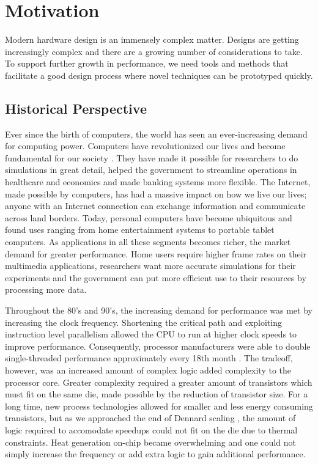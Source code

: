 \section{Motivation}

Modern hardware design is an immensely complex matter. Designs are getting
increasingly complex and there are a growing number of considerations to take.
To support further growth in performance, we need tools and methods that
facilitate a good design process where novel techniques can be prototyped
quickly.

\subsection{Historical Perspective}

Ever since the birth of computers, the world has seen an ever-increasing demand
for computing power. Computers have revolutionized our lives and become
fundamental for our society \cite{tanenbaum1984structured}. They have made it possible for
researchers to do simulations in great detail, helped the government to
streamline operations in healthcare and economics and made banking systems more
flexible. The Internet, made possible by computers, has had a massive impact on
how we live our lives; anyone with an Internet connection can exchange
information and communicate across land borders. Today, personal computers have
become ubiquitous and found uses ranging from home entertainment systems to
portable tablet computers. As applications in all these segments becomes richer,
the market demand for greater performance. Home users require higher frame
rates on their multimedia applications, researchers want more accurate
simulations for their experiments and the government can put more efficient use to
their resources by processing more data.

Throughout the 80's and 90's, the increasing demand for performance was met by
increasing the clock frequency. Shortening the critical path and exploiting
instruction level parallelism allowed the CPU to run at higher clock speeds to
improve performance. Consequently, processor manufacturers were able to double
single-threaded performance approximately every 18th month
\cite{moore1965cramming}. The tradeoff, however, was an increased amount of
complex logic added complexity to the processor core. Greater complexity
required a greater amount of transistors which must fit on the same die, made
possible by the reduction of transistor size. For a long time, new process
technologies allowed for smaller and less energy consuming transistors, but as
we approached the end of Dennard scaling
\cite{dennard1974design,esmaeilzadeh2011dark}, the amount of logic required to
accomodate speedups could not fit on the die due to thermal constraints. Heat
generation on-chip became overwhelming and one could not simply increase the
frequency or add extra logic to gain additional performance.

